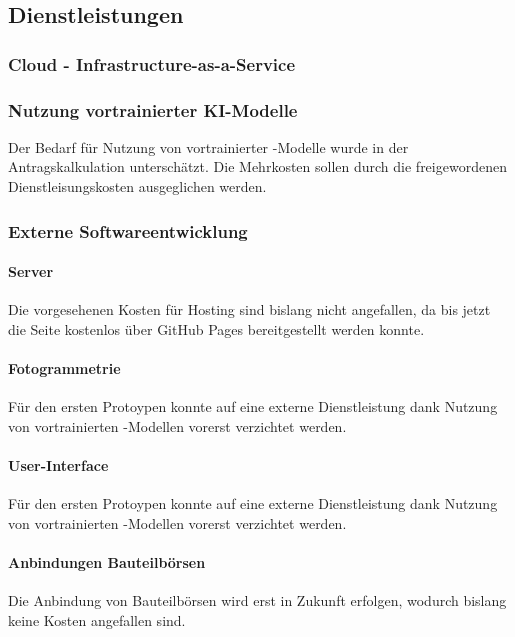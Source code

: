 \documentclass[type=zwischenbericht]{zukunftbau}
\begin{document}
\subsection{Dienstleistungen}


\subsubsection{Cloud - Infrastructure-as-a-Service}
\subsubsection{Nutzung vortrainierter KI-Modelle}
Der Bedarf für Nutzung von vortrainierter -Modelle wurde in der Antragskalkulation unterschätzt. Die Mehrkosten sollen durch die freigewordenen Dienstleisungskosten ausgeglichen werden. 

\subsubsection{Externe Softwareentwicklung}
\begin{SemioNest}

\paragraph{Server}

Die vorgesehenen Kosten für Hosting sind bislang nicht angefallen, da bis jetzt die Seite kostenlos über GitHub Pages bereitgestellt werden konnte. 

\paragraph{Fotogrammetrie}

Für den ersten Protoypen konnte auf eine externe Dienstleistung dank Nutzung von vortrainierten -Modellen vorerst verzichtet werden.

\paragraph{User-Interface}

Für den ersten Protoypen konnte auf eine externe Dienstleistung dank Nutzung von vortrainierten -Modellen vorerst verzichtet werden.

\paragraph{Anbindungen Bauteilbörsen}

Die Anbindung von Bauteilbörsen wird erst in Zukunft erfolgen, wodurch bislang keine Kosten angefallen sind.

\end{SemioNest}
\end{document}

